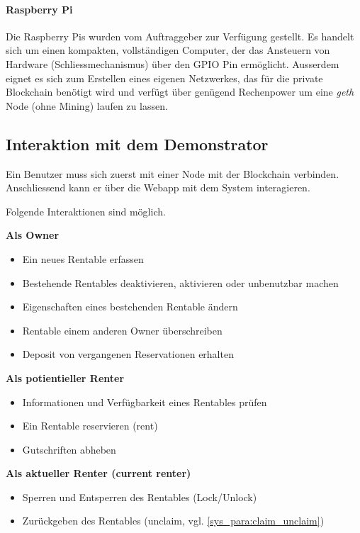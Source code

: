 \paragraph{Raspberry Pi}
Die Raspberry Pis wurden vom Auftraggeber zur Verfügung gestellt. Es handelt sich um einen kompakten, vollständigen Computer, der das Ansteuern von Hardware (Schliessmechanismus) über den GPIO Pin ermöglicht. Ausserdem eignet es sich zum Erstellen eines eigenen Netzwerkes, das für die private Blockchain benötigt wird und verfügt über genügend Rechenpower um eine \emph{geth} Node (ohne Mining) laufen zu lassen.

\subsection{Interaktion mit dem Demonstrator}
\label{sec:Interaktion mit dem Demonstrator}

Ein Benutzer muss sich zuerst mit einer Node mit der Blockchain verbinden. Anschliessend kann er über die Webapp mit dem System interagieren.

\vspace{0.7em}\noindent
Folgende Interaktionen sind möglich.

\vspace{0.7em}\noindent
\textbf{Als Owner}
\begin{itemize}
    \item Ein neues Rentable erfassen
    \item Bestehende Rentables deaktivieren, aktivieren oder unbenutzbar machen
    \item Eigenschaften eines bestehenden Rentable ändern
    \item Rentable einem anderen Owner überschreiben
    \item Deposit von vergangenen Reservationen erhalten
\end{itemize}

\vspace{0.7em}\noindent
\textbf{Als potientieller Renter}
\begin{itemize}
    \item Informationen und Verfügbarkeit eines Rentables prüfen
    \item Ein Rentable reservieren (rent)
    \item Gutschriften abheben
\end{itemize}

\vspace{0.7em}\noindent
\textbf{Als aktueller Renter (current renter)}
\begin{itemize}
    \item Sperren und Entsperren des Rentables (Lock/Unlock)
    \item Zurückgeben des Rentables (unclaim, vgl. \ref{sys_para:claim_unclaim})
\end{itemize}

